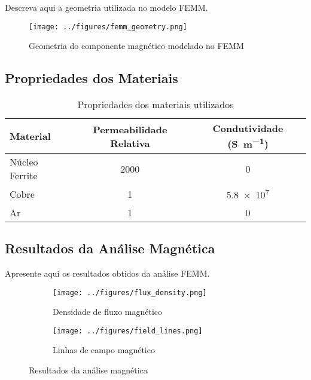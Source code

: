 \documentclass[12pt, a4paper]{article}
\begin{document}
Descreva aqui a geometria utilizada no modelo FEMM.

\begin{figure}[H]
    \centering
    \texttt{[image: ../figures/femm\_geometry.png]}
    \caption{Geometria do componente magnético modelado no FEMM}
    \label{fig:femm_geometry}
\end{figure}

\subsection{Propriedades dos Materiais}

\begin{table}[H]
    \centering
    \caption{Propriedades dos materiais utilizados}
    \label{tab:materiais}
    \begin{tabular}{@{}lcc@{}}
        \toprule
        Material & Permeabilidade Relativa & Condutividade (\si{\siemens\per\meter}) \\
        \midrule
        Núcleo Ferrite & 2000 & 0 \\
        Cobre & 1 & \num{5.8e7} \\
        Ar & 1 & 0 \\
        \bottomrule
    \end{tabular}
\end{table}

\subsection{Resultados da Análise Magnética}

Apresente aqui os resultados obtidos da análise FEMM.

\begin{figure}[H]
    \centering
    \begin{subfigure}{0.45\textwidth}
        \texttt{[image: ../figures/flux\_density.png]}
        \caption{Densidade de fluxo magnético}
        \label{fig:flux_density}
    \end{subfigure}
    \hfill
    \begin{subfigure}{0.45\textwidth}
        \texttt{[image: ../figures/field\_lines.png]}
        \caption{Linhas de campo magnético}
        \label{fig:field_lines}
    \end{subfigure}
    \caption{Resultados da análise magnética}
    \label{fig:magnetic_analysis}
\end{figure}
\end{document}
